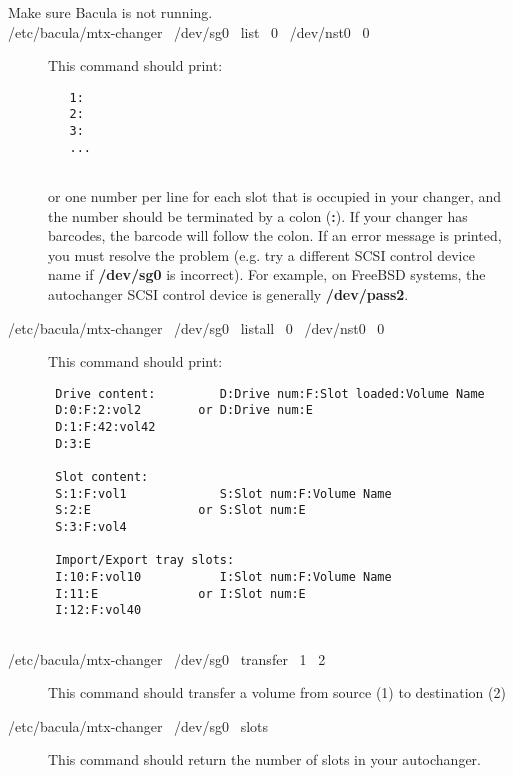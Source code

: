 \begin{description}

\item [Make sure Bacula is not running.]

\item [/etc/bacula/mtx-changer \ /dev/sg0 \ list \ 0 \ /dev/nst0 \ 0]

This command should print:  

\footnotesize
\begin{verbatim}
   1:
   2:
   3:
   ...
   
\end{verbatim}
\normalsize

or one number per line for each slot that is  occupied in your changer, and
the number should be  terminated by a colon ({\bf :}). If your changer has 
barcodes, the barcode will follow the colon.  If an error message is printed,
you must resolve the  problem (e.g. try a different SCSI control device name
if {\bf /dev/sg0}  is incorrect). For example, on FreeBSD systems, the
autochanger  SCSI control device is generally {\bf /dev/pass2}.  

\item [/etc/bacula/mtx-changer \ /dev/sg0 \ listall \ 0 \ /dev/nst0 \ 0]

This command should print:  

\footnotesize
\begin{verbatim}
 Drive content:         D:Drive num:F:Slot loaded:Volume Name
 D:0:F:2:vol2        or D:Drive num:E
 D:1:F:42:vol42   
 D:3:E

 Slot content:
 S:1:F:vol1             S:Slot num:F:Volume Name
 S:2:E               or S:Slot num:E
 S:3:F:vol4

 Import/Export tray slots:
 I:10:F:vol10           I:Slot num:F:Volume Name
 I:11:E              or I:Slot num:E
 I:12:F:vol40
   
\end{verbatim}
\normalsize

\item [/etc/bacula/mtx-changer \ /dev/sg0 \ transfer \ 1 \ 2]

This command should transfer a volume from source (1) to destination (2)

\item [/etc/bacula/mtx-changer \ /dev/sg0 \ slots ]

This command should return the number of slots in your autochanger.  


\end{description}
